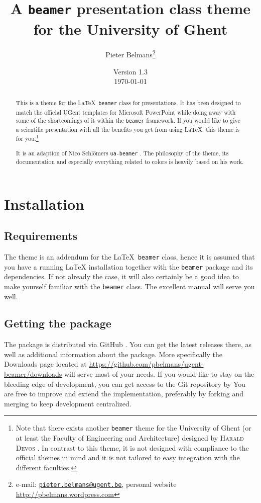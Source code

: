\documentclass[a4paper,10pt]{article}
\title{A \texttt{beamer} presentation class theme for the University of Ghent}
\author{Pieter Belmans\thanks{e-mail: \href{mailto:pieter.belmans@ugent.be}{\nolinkurl{pieter.belmans@ugent.be}}, personal website \url{http://pbelmans.wordpress.com}}}
\date{Version 1.3 \\ \today}
\theoremstyle{definition}
\begin{document}
\maketitle

\begin{abstract}
  This is a theme for the \LaTeX\ \texttt{beamer} class for presentations. It has been designed to match the official UGent templates for Microsoft PowerPoint\textsuperscript{\textregistered} while doing away with some of the shortcomings of it within the \texttt{beamer} framework. If you would like to give a scientific presentation with all the benefits you get from using \LaTeX, this theme is for you.\footnote{Note that there exists another \texttt{beamer} theme for the University of Ghent (or at least the Faculty of Engineering and Architecture) designed by \textsc{Harald Devos} \cite{devos-theme}. In contrast to this theme, it is not designed with compliance to the official themes in mind and it is not tailored to easy integration with the different faculties.}

  It is an adaption of Nico Schl\"omers \texttt{ua-beamer} \cite{ua-beamer}. The philosophy of the theme, its documentation and especially everything related to colors is heavily based on his work.
\end{abstract}


\section{Installation}

\subsection{Requirements}
  The theme is an addendum for the \LaTeX\ \texttt{beamer} class, hence it is assumed that you have a running \LaTeX{} installation together with the \texttt{beamer} package \cite{beamer-repository} and its dependencies. If not already the case, it will also certainly be a good idea to make yourself familiar with the \texttt{beamer} class. The excellent manual \cite{beamer-manual} will serve you well.

\subsection{Getting the package}

The package is distributed via GitHub \cite{ugent-beamer}. You can get the latest releases there, as well as additional information about the package. More specifically the Downloads page located at \url{https://github.com/pbelmans/ugent-beamer/downloads} will serve most of your needs. If you would like to stay on the bleeding edge of development, you can get access to the Git repository by
You are free to improve and extend the implementation, preferably by forking and merging to keep development centralized.
\end{document}
